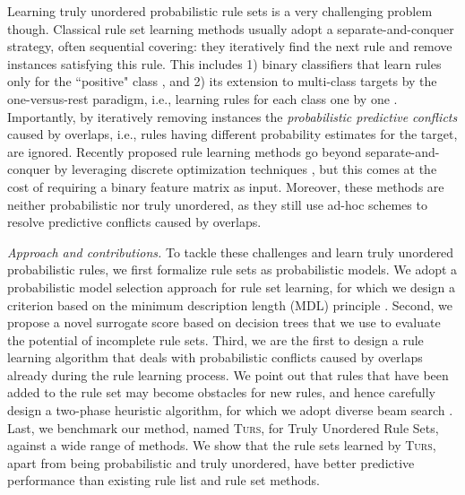 Learning truly unordered probabilistic rule sets is a very challenging problem though. Classical rule set learning methods usually adopt a separate-and-conquer strategy, often sequential covering: they iteratively find the next rule and remove instances satisfying this rule. This includes 1) binary classifiers that learn rules only for the ``positive" class \citep{furnkranz2012foundations}, and 2) its extension to multi-class targets by the one-versus-rest paradigm, i.e., learning rules for each class one by one \citep{cohen1995ripper,clark1991cn2Improve}. Importantly, by iteratively removing instances the \emph{probabilistic predictive conflicts} caused by overlaps, i.e., rules having different probability estimates for the target, are ignored. Recently proposed rule learning methods go beyond separate-and-conquer by leveraging discrete optimization techniques \citep{zhang2020diverseRuleSets,wang2017bayesian,yang2021learning,lakkaraju2016interpretable,dash2018boolean}, but this comes at the cost of requiring a binary feature matrix as input. Moreover, these methods are neither probabilistic nor truly unordered, as they still use ad-hoc schemes to resolve predictive conflicts caused by overlaps. 

\emph{Approach and contributions.}
To tackle these challenges and learn truly unordered probabilistic rules, we first formalize rule sets as probabilistic models. We adopt a probabilistic model selection approach for rule set learning, for which we design a criterion based on the minimum description length (MDL) principle \citep{grunwald2019minimum}. Second, we propose a novel surrogate score based on decision trees that we use to evaluate the potential of incomplete rule sets. Third, we are the first to design a rule learning algorithm that deals with probabilistic conflicts caused by overlaps already during the rule learning process. We point out that rules that have been added to the rule set may become obstacles for new rules, and hence carefully design a two-phase heuristic algorithm, for which we adopt diverse beam search \citep{matthijs2012diverse}. 
Last, we benchmark our method, named \textsc{Turs}, for Truly Unordered Rule Sets, against a wide range of methods. We show that the rule sets learned by \textsc{Turs}, apart from being probabilistic and truly unordered, have better predictive performance than existing rule list and rule set methods. 

